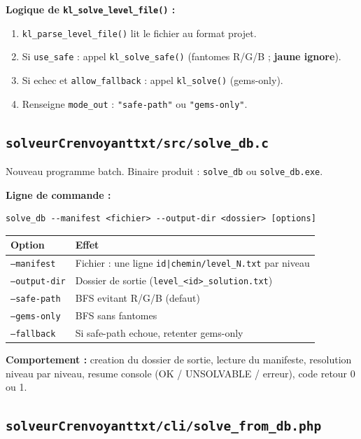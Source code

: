 \documentclass[11pt,a4paper]{article}
\begin{document}
\textbf{Logique de \texttt{kl\_solve\_level\_file()} :}
\begin{enumerate}
    \item \texttt{kl\_parse\_level\_file()} lit le fichier au format projet.
    \item Si \texttt{use\_safe} : appel \texttt{kl\_solve\_safe()} (fantomes R/G/B ; \textbf{jaune ignore}).
    \item Si echec et \texttt{allow\_fallback} : appel \texttt{kl\_solve()} (gems-only).
    \item Renseigne \texttt{mode\_out} : \texttt{"safe-path"} ou \texttt{"gems-only"}.
\end{enumerate}

\subsection{\texttt{solveurCrenvoyanttxt/src/solve\_db.c}}

Nouveau programme batch. Binaire produit : \texttt{solve\_db} ou \texttt{solve\_db.exe}.

\textbf{Ligne de commande :}
\begin{lstlisting}[style=kllisting]
solve_db --manifest <fichier> --output-dir <dossier> [options]
\end{lstlisting}

\begin{table}[h]
\centering
\small
\begin{tabular}{@{}ll@{}}
\toprule
\textbf{Option} & \textbf{Effet} \\
\midrule
\texttt{--manifest} & Fichier : une ligne \texttt{id|chemin/level\_N.txt} par niveau \\
\texttt{--output-dir} & Dossier de sortie (\texttt{level\_<id>\_solution.txt}) \\
\texttt{--safe-path} & BFS evitant R/G/B (defaut) \\
\texttt{--gems-only} & BFS sans fantomes \\
\texttt{--fallback} & Si safe-path echoue, retenter gems-only \\
\bottomrule
\end{tabular}
\end{table}

\textbf{Comportement :} creation du dossier de sortie, lecture du manifeste, resolution niveau par niveau, resume console (OK / UNSOLVABLE / erreur), code retour 0 ou 1.

\subsection{\texttt{solveurCrenvoyanttxt/cli/solve\_from\_db.php}}
\end{document}
